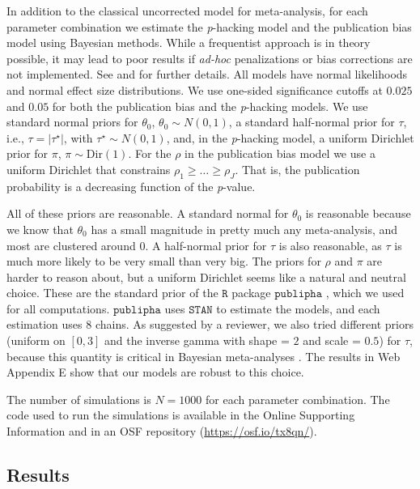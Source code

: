 \documentclass[useAMS,usenatbib,referee]{biom}
\begin{document}
In addition to the classical uncorrected model for meta-analysis, for each parameter combination we estimate the \textit{p}-hacking model and the publication bias model using Bayesian methods. While a frequentist approach is in theory possible, it may lead to poor results if {\it ad-hoc} penalizations or bias corrections are not implemented. See  \citet[Appendix, 1]{mcshane2016adjusting} and \citet{Moss2019} for further details. All models have normal likelihoods and normal effect size distributions. We use one-sided significance cutoffs at $0.025$ and $0.05$ for both the publication bias and the \textit{p}-hacking models. We use standard normal priors for $\theta_0$, $\theta_0 \sim N(0, 1)$, a standard half-normal prior for $\tau$, i.e., $\tau = |\tau^\star|$, with $\tau^\star \sim N(0, 1)$, and, in the \textit{p}-hacking model, a uniform Dirichlet prior for $\pi$, $\pi \sim \textrm{Dir}(1)$. For the $\rho$ in the publication bias model we use a uniform Dirichlet that constrains $\rho_{1}\geq\ldots\geq\rho_{J}$. That is, the publication probability is a decreasing function of the \textit{p}-value.

All of these priors are reasonable. A standard normal for $\theta_0$ is reasonable because we know that $\theta_0$ has a small magnitude in pretty much any meta-analysis, and most are clustered around $0$. A half-normal prior for $\tau$ is also reasonable, as $\tau$ is much more likely to be very small than very big. The priors for $\rho$ and $\pi$ are harder to reason about, but a uniform Dirichlet seems like a natural and neutral choice. These are the standard prior of the $\mathtt{R}$ package $\mathtt{publipha}$ \citep{publipha}, which we used for all computations. $\mathtt{publipha}$ uses $\mathtt{STAN}$ \citep{Carpenter2017-cf} to estimate the models, and each estimation uses $8$ chains. As suggested by a reviewer, we also tried different priors (uniform on $[0,3]$ and the inverse gamma with shape = $2$ and scale = $0.5$) for $\tau$, because this quantity is critical in Bayesian meta-analyses \citep[see, e.g.][]{TurnerAl2012}. The results in Web Appendix E show that our models are robust to this choice.

The number of simulations is $N = 1000$ for each parameter combination. The code used to run the simulations is available in the Online Supporting Information and in an OSF repository (\url{https://osf.io/tx8qn/}).

\subsection{Results}
\end{document}
